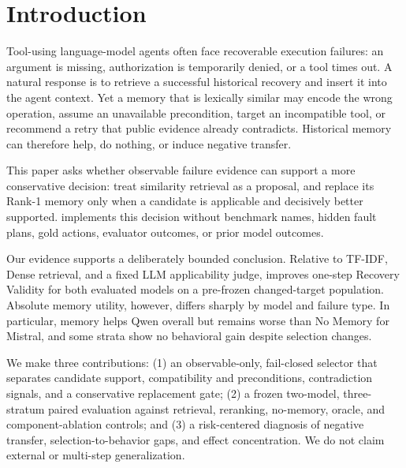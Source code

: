 \section{Introduction}

Tool-using language-model agents often face recoverable execution failures: an argument is missing, authorization is temporarily denied, or a tool times out. A natural response is to retrieve a successful historical recovery and insert it into the agent context. Yet a memory that is lexically similar may encode the wrong operation, assume an unavailable precondition, target an incompatible tool, or recommend a retry that public evidence already contradicts. Historical memory can therefore help, do nothing, or induce negative transfer.

This paper asks whether observable failure evidence can support a more conservative decision: treat similarity retrieval as a proposal, and replace its Rank-1 memory only when a candidate is applicable and decisively better supported. \proper{} implements this decision without benchmark names, hidden fault plans, gold actions, evaluator outcomes, or prior model outcomes.

Our evidence supports a deliberately bounded conclusion. Relative to TF-IDF, Dense retrieval, and a fixed LLM applicability judge, \proper{} improves one-step Recovery Validity for both evaluated models on a pre-frozen changed-target population. Absolute memory utility, however, differs sharply by model and failure type. In particular, memory helps Qwen overall but remains worse than No Memory for Mistral, and some strata show no behavioral gain despite selection changes.

We make three contributions: (1) an observable-only, fail-closed selector that separates candidate support, compatibility and preconditions, contradiction signals, and a conservative replacement gate; (2) a frozen two-model, three-stratum paired evaluation against retrieval, reranking, no-memory, oracle, and component-ablation controls; and (3) a risk-centered diagnosis of negative transfer, selection-to-behavior gaps, and effect concentration. We do not claim external or multi-step generalization.
